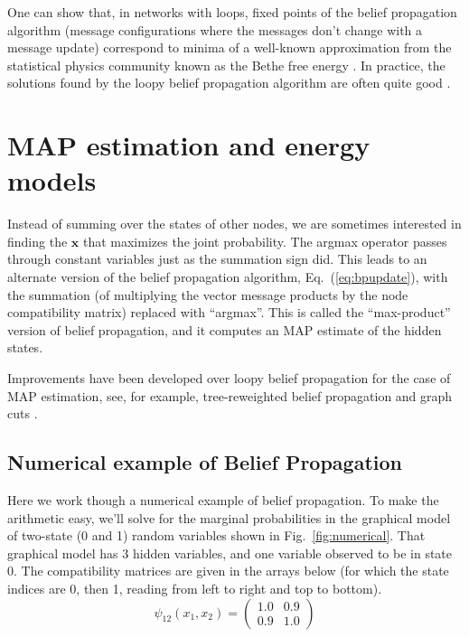 One can show that, in networks with loops, fixed points of the
belief propagation algorithm (message configurations where the
messages don't change with a message update) correspond to minima of a
well-known approximation from the statistical physics community known 
as the Bethe free energy \cite{Yedidia00b}.  In practice, the solutions found by the loopy belief propagation algorithm are often quite good \cite{Murphy1999}.


\section{MAP estimation and energy models}

Instead of summing over the states of other nodes, we are sometimes
interested in finding the $\mathbf{x}$ that maximizes the joint probability.  The argmax
operator passes through constant variables just as the summation sign
did.  This leads to an alternate version of the belief propagation
algorithm, Eq.~(\ref{eq:bpupdate}), with the summation (of multiplying the vector message products by the node compatibility matrix) replaced with ``argmax''.  This is
called the ``max-product'' version of belief propagation, and it
computes an MAP estimate of the hidden states.   

Improvements have been developed over loopy belief propagation for the
case of MAP estimation, see, for example, tree-reweighted belief propagation \cite{Kolmogorov2006} and graph cuts \cite{Zabih2004}.


\subsection{Numerical example of Belief Propagation}
\label{sect:numerical}

Here we work though a numerical example of belief propagation.  To make the arithmetic easy,
we'll solve for the marginal probabilities in the graphical model of
two-state (0 and 1) random variables shown in Fig.~\ref{fig:numerical}.  That
graphical model has 3 hidden variables, and one variable observed to
be in state 0.  The compatibility matrices are given in the arrays
below (for which the state indices are 0, then 1, reading from left to
right and top to bottom).
\begin{equation}
\psi_{12}(x_1, x_2) = 
\left( 
\begin{array}{cc}
1.0 & 0.9 \\
0.9 & 1.0 
\end{array}
\right)
\end{equation}

